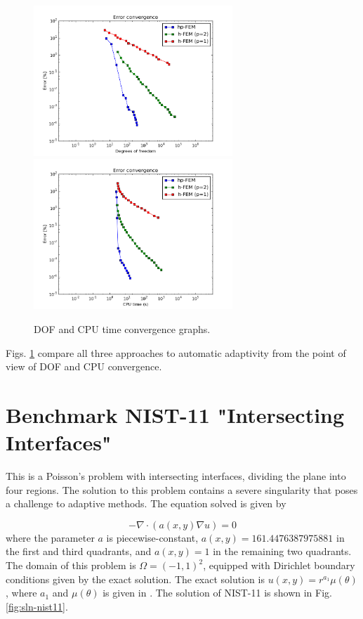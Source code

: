 \documentclass[12pt]{elsarticle}
\begin{document}
\begin{figure}[H]
\centering
\vspace{-3mm}
\hspace{-50mm}
\includegraphics[width=7.5cm]{nist/nist-10/conv_dof_aniso.png}\ \
\hspace{-10mm}
\includegraphics[width=7.5cm]{nist/nist-10/conv_cpu_aniso.png}
\hspace{-50mm}
\vspace{-3mm}
\caption{DOF and CPU time convergence graphs.}
\label{fig:nist-10-conv}
\end{figure}

Figs. \ref{fig:nist-10-conv} compare all
three approaches to automatic adaptivity from the point
of view of DOF and CPU convergence.

\section{Benchmark NIST-11 "Intersecting Interfaces"}
\label{sec:bench-11}

This is a Poisson's problem with intersecting interfaces,
dividing the plane into four regions.
The solution to this problem contains a severe
singularity that poses a challenge to adaptive methods.
The equation solved is given by

\begin{equation} \label{intersecting}
-\nabla \cdot (a(x,y) \nabla u) = 0
\end{equation}
where the parameter $a$ is piecewise-constant,
$a(x,y) = 161.4476387975881$ in the first and third quadrants,
and $a(x,y) = 1$ in the remaining two quadrants.
The domain of this problem is $\Omega = (-1, 1)^2$, equipped with
Dirichlet boundary conditions given by the exact solution.
The exact solution is
$u(x,y) = r^{a_1} \mu (\theta)$,
where $a_1$ and $\mu (\theta)$ is given in \cite{mitchell-1}.
The solution of NIST-11 is shown in Fig. \ref{fig:sln-nist11}.
\end{document}
